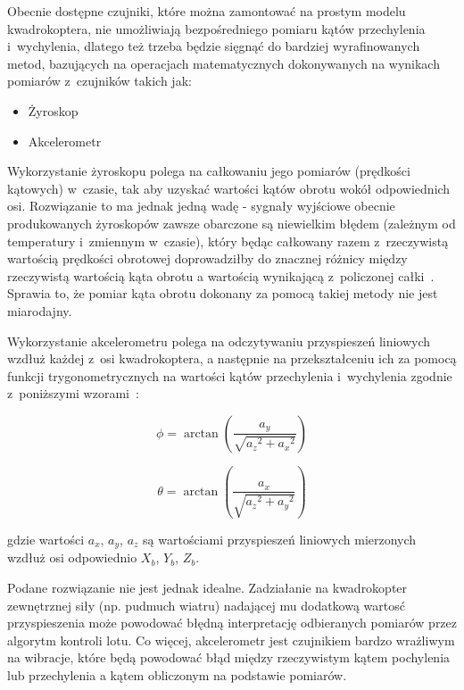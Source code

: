 Obecnie dostępne czujniki, które można zamontować na prostym modelu kwadrokoptera, nie umożliwiają bezpośredniego pomiaru kątów przechylenia i~wychylenia, dlatego też trzeba będzie sięgnąć do bardziej wyrafinowanych metod, bazujących na operacjach matematycznych dokonywanych na wynikach pomiarów z~czujników takich jak:

\begin{itemize}
	\item Żyroskop
	\item Akcelerometr
\end{itemize} 

Wykorzystanie żyroskopu polega na całkowaniu jego pomiarów (prędkości kątowych) w~czasie, tak aby uzyskać wartości kątów obrotu wokół odpowiednich osi. Rozwiązanie to ma jednak jedną wadę - sygnały wyjściowe obecnie produkowanych  żyroskopów zawsze obarczone są niewielkim błędem (zależnym od temperatury i~zmiennym w~czasie), który będąc całkowany razem z~rzeczywistą wartością prędkości obrotowej doprowadziłby do znacznej różnicy między rzeczywistą wartością kąta obrotu a wartością wynikającą z~policzonej całki~\cite{quadro9, filters1}. Sprawia to, że pomiar kąta obrotu dokonany za pomocą takiej metody nie jest miarodajny.

Wykorzystanie akcelerometru polega na odczytywaniu przyspieszeń liniowych wzdłuż każdej z~osi kwadrokoptera, a następnie na przekształceniu ich za pomocą funkcji trygonometrycznych na wartości kątów przechylenia i~wychylenia zgodnie z~poniższymi wzorami~\cite{mems5}:

\begin{equation}
	\phi = \arctan(\frac{a_y}{\sqrt{a{_z}^2 + a{_x}^2}})
\end{equation}

\begin{equation}
	\theta = \arctan(\frac{a_x}{\sqrt{a{_z}^2 + a{_y}^2}})
\end{equation}

gdzie wartości $a_x$, $a_y$, $a_z$ są wartościami przyspieszeń liniowych mierzonych wzdłuż osi odpowiednio $X_b$, $Y_b$, $Z_b$.

Podane rozwiązanie nie jest jednak idealne. Zadziałanie na kwadrokopter zewnętrznej siły (np. pudmuch wiatru) nadającej mu dodatkową wartosć przyspieszenia może powodować błędną interpretację odbieranych pomiarów przez algorytm kontroli lotu. Co więcej, akcelerometr jest czujnikiem bardzo wrażliwym na wibracje, które będą powodować błąd między rzeczywistym kątem pochylenia lub przechylenia a kątem obliczonym na podstawie pomiarów.

